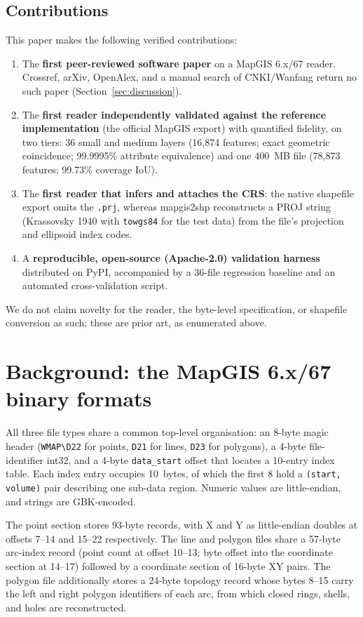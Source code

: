 \documentclass[11pt,a4paper]{article}
\begin{document}
\subsection{Contributions}
This paper makes the following verified contributions:
\begin{enumerate}
  \item The \textbf{first peer-reviewed software paper} on a MapGIS 6.x/67 reader. Crossref, arXiv, OpenAlex, and a manual search of CNKI/Wanfang return no such paper (Section~\ref{sec:discussion}).
  \item The \textbf{first reader independently validated against the reference implementation} (the official MapGIS export) with quantified fidelity, on two tiers: 36 small and medium layers (16{,}874 features; exact geometric coincidence; 99.9995\% attribute equivalence) and one 400~MB file (78{,}873 features; 99.73\% coverage IoU).
  \item The \textbf{first reader that infers and attaches the CRS}: the native shapefile export omits the \texttt{.prj}, whereas mapgis2shp reconstructs a PROJ string (Krassovsky 1940 with \texttt{towgs84} for the test data) from the file's projection and ellipsoid index codes.
  \item A \textbf{reproducible, open-source (Apache-2.0) validation harness} distributed on PyPI, accompanied by a 36-file regression baseline and an automated cross-validation script.
\end{enumerate}
We do not claim novelty for the reader, the byte-level specification, or shapefile conversion as such; these are prior art, as enumerated above.

\section{Background: the MapGIS 6.x/67 binary formats}
All three file types share a common top-level organisation: an 8-byte magic header (\texttt{WMAP\textbackslash{}D22} for points, \texttt{D21} for lines, \texttt{D23} for polygons), a 4-byte file-identifier int32, and a 4-byte \texttt{data\_start} offset that locates a 10-entry index table. Each index entry occupies 10~bytes, of which the first 8 hold a \texttt{(start, volume)} pair describing one sub-data region. Numeric values are little-endian, and strings are GBK-encoded.

The point section stores 93-byte records, with X and Y as little-endian doubles at offsets 7--14 and 15--22 respectively. The line and polygon files share a 57-byte arc-index record (point count at offset 10--13; byte offset into the coordinate section at 14--17) followed by a coordinate section of 16-byte XY pairs. The polygon file additionally stores a 24-byte topology record whose bytes 8--15 carry the left and right polygon identifiers of each arc, from which closed rings, shells, and holes are reconstructed.
\end{document}
